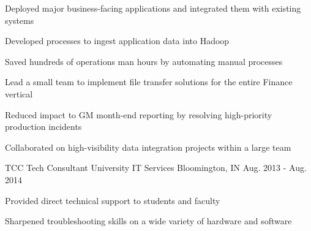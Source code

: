 \begin{cventries}
{\begin{cvitems}
         \item {Deployed major business-facing applications and integrated them with existing systems}
         \item {Developed processes to ingest application data into Hadoop}
         \item {Saved hundreds of operations man hours by automating manual processes}
         \item {Lead a small team to implement file transfer solutions for the entire Finance vertical}
         \item {Reduced impact to GM month-end reporting by resolving high-priority production incidents}
         \item {Collaborated on high-visibility data integration projects within a large team}
      \end{cvitems}
    }

  \cventry
    {TCC Tech Consultant} %
    {University IT Services} %
    {Bloomington, IN} %
    {Aug. 2013 - Aug. 2014} %
    {
      \begin{cvitems} %
        \item {Provided direct technical support to students and faculty}
        \item {Sharpened troubleshooting skills on a wide variety of hardware and software}
      \end{cvitems}
    }

\end{cventries}
